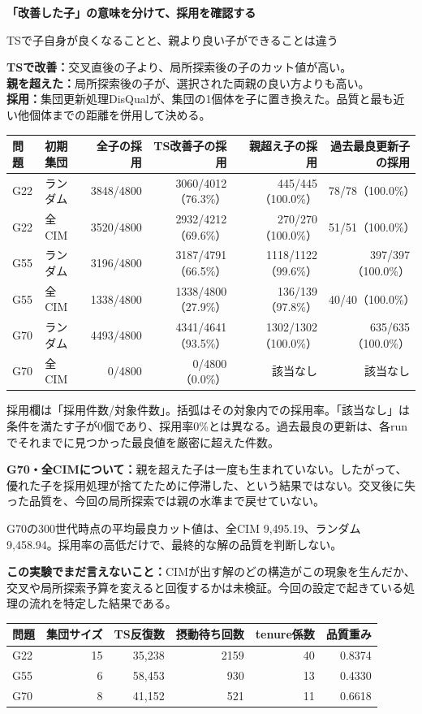 \documentclass[11pt,a4paper,landscape]{ltjsarticle}
\newcommand{\heading}[2]{{\LARGE\bfseries\color{ink}#1}\par{\small #2}\par\vspace{2mm}}
\begin{document}
\clearpage
\heading{「改善した子」の意味を分けて、採用を確認する}{TSで子自身が良くなることと、親より良い子ができることは違う}
\textbf{TSで改善：}交叉直後の子より、局所探索後の子のカット値が高い。\\
\textbf{親を超えた：}局所探索後の子が、選択された両親の良い方よりも高い。\\
\textbf{採用：}集団更新処理DisQualが、集団の1個体を子に置き換えた。品質と最も近い他個体までの距離を併用して決める。

\begin{center}\small
\begin{tabular}{llrrrr}\toprule
問題 & 初期集団 & 全子の採用 & TS改善子の採用 & 親超え子の採用 & 過去最良更新子の採用\\\midrule
G22 & ランダム & 3848/4800 & 3060/4012（76.3\%） & 445/445（100.0\%） & 78/78（100.0\%）\\
G22 & 全CIM & 3520/4800 & 2932/4212（69.6\%） & 270/270（100.0\%） & 51/51（100.0\%）\\
G55 & ランダム & 3196/4800 & 3187/4791（66.5\%） & 1118/1122（99.6\%） & 397/397（100.0\%）\\
G55 & 全CIM & 1338/4800 & 1338/4800（27.9\%） & 136/139（97.8\%） & 40/40（100.0\%）\\
G70 & ランダム & 4493/4800 & 4341/4641（93.5\%） & 1302/1302（100.0\%） & 635/635（100.0\%）\\
G70 & 全CIM & 0/4800 & 0/4800（0.0\%） & 該当なし & 該当なし\\
\bottomrule\end{tabular}
\end{center}
{\small 採用欄は「採用件数/対象件数」。括弧はその対象内での採用率。「該当なし」は条件を満たす子が0個であり、採用率0\%とは異なる。過去最良の更新は、各runでそれまでに見つかった最良値を厳密に超えた件数。}

\textbf{G70・全CIMについて：}親を超えた子は一度も生まれていない。したがって、優れた子を採用処理が捨てたために停滞した、という結果ではない。交叉後に失った品質を、今回の局所探索では親の水準まで戻せていない。

{\small G70の300世代時点の平均最良カット値は、全CIM 9,495.19、ランダム 9,458.94。採用率の高低だけで、最終的な解の品質を判断しない。}

\textbf{この実験でまだ言えないこと：}CIMが出す解のどの構造がこの現象を生んだか、交叉や局所探索予算を変えると回復するかは未検証。今回の設定で起きている処理の流れを特定した結果である。

\begin{center}\small
\begin{tabular}{lrrrrr}\toprule
問題 & 集団サイズ & TS反復数 & 摂動待ち回数 & tenure係数 & 品質重み\\\midrule
G22 & 15 & 35,238 & 2159 & 40 & 0.8374\\
G55 & 6 & 58,453 & 930 & 13 & 0.4330\\
G70 & 8 & 41,152 & 521 & 11 & 0.6618\\
\bottomrule\end{tabular}
\end{center}
\end{document}
